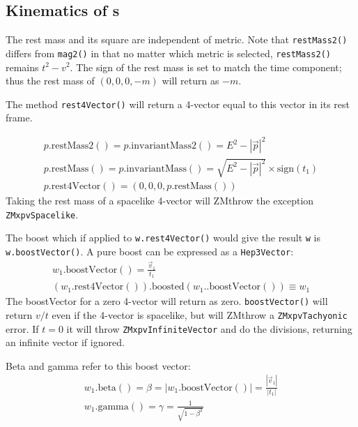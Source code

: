 \documentclass[twoside,12pt]{article}
\def \SV {{\tt Hep3Vector}}
\def \LV {{\tt HepLorentzVector}}
\begin{document}
\subsection{Kinematics of \protect\LV s}

The rest mass and its square are independent of metric.
Note that {\tt restMass2()} differs from {\tt mag2()} in that no matter
which metric is selected, {\tt restMass2()} remains $t^2-v^2$.
The sign of the
rest mass is set to match the time component; thus the rest mass of
$(0,0,0,-m)$ will return as $-m$.

The method {\tt rest4Vector()} will return a 4-vector equal to this vector
in its rest frame.

\begin{eqnarray}
\label{eq:wrestM2}
  p\mbox{.restMass2}() = p\mbox{.invariantMass2}() = E^2 - |\vec{p}|^2 \\
\label{eq:wrestM}
  p\mbox{.restMass}() = p\mbox{.invariantMass}() =
	\sqrt {E^2 - |\vec{p}|^2} \times \mbox{sign}(t_1) \\
\label{eq:wrest4V}
  p\mbox{.rest4Vector}() =  \left( 0, 0, 0, p\mbox{.restMass}() \right)
\end{eqnarray}
\noindent
Taking the rest mass of a spacelike 4-vector will ZMthrow the exception
{\tt ZMxpvSpacelike}.

\noindent
The boost which if applied to {\tt w.rest4Vector()} would give the result
{\tt w} is {\tt w.boostVector()}.  A pure boost can be expressed as a \SV:
\begin{eqnarray}
\label{boostvector}
  w_1\mbox{.boostVector}() =  \frac{\vec{v}_1}{t_1} \\
  \left(w_1\mbox{.rest4Vector}()\right)\mbox{.boosted}
  		\left(w_1.\mbox{.boostVector}() \right) \equiv w_1 \nonumber
\end{eqnarray}
\noindent
The boostVector for a zero 4-vector will return as zero.
{\tt boostVector()}
will return $v/t$ even if the 4-vector is spacelike, but will ZMthrow a
{\tt ZMxpvTachyonic} error.
If $ t=0 $ it will throw {\tt ZMxpvInfiniteVector} and do the divisions,
returning an infinite vector if ignored.

Beta and gamma refer to this boost vector:
\begin{eqnarray}
\label{eq:wbeta}
  w_1\mbox{.beta}() = \beta = \left| w_1\mbox{.boostVector}() \right |
  = \frac{\left| \vec{v}_1 \right|} {| t_1 |} \\
\label{eq:wgamma}
  w_1\mbox{.gamma}() = \gamma = \frac{1}{\sqrt{1-\beta^2}}
\end{eqnarray}
\end{document}
